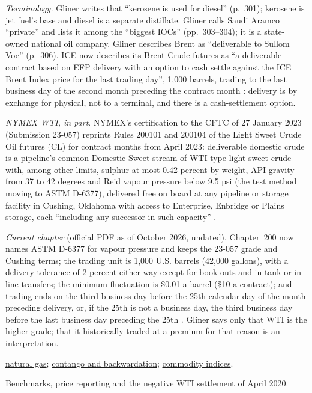 \begin{qfdefinition}
 \emph{Terminology.} Gliner writes that ``kerosene is used for diesel'' (p.~301); kerosene is jet fuel's base and diesel is a separate distillate. Gliner calls Saudi Aramco ``private'' and lists it among the ``biggest IOCs'' (pp.~303--304); it is a state-owned national oil company. Gliner describes Brent as ``deliverable to Sullom Voe'' (p.~306). ICE now describes its Brent Crude futures as ``a deliverable contract based on EFP delivery with an option to cash settle against the ICE Brent Index price for the last trading day'', 1,000 barrels, trading to the last business day of the second month preceding the contract month \citep[contract specifications]{ice-brent-spec}: delivery is by exchange for physical, not to a terminal, and there is a cash-settlement option.

\emph{NYMEX WTI, in part}. NYMEX's certification to the CFTC of 27 January 2023 (Submission 23-057) reprints Rules 200101 and 200104 of the Light Sweet Crude Oil futures (CL) for contract months from April 2023: deliverable domestic crude is a pipeline's common Domestic Sweet stream of WTI-type light sweet crude with, among other limits, sulphur at most 0.42 percent by weight, API gravity from 37 to 42 degrees and Reid vapour pressure below 9.5 psi (the test method moving to ASTM D-6377), delivered free on board at any pipeline or storage facility in Cushing, Oklahoma with access to Enterprise, Enbridge or Plains storage, each ``including any successor in such capacity'' \citep[Exhibits A--B]{nymex-23-057}.

\emph{Current chapter} (official PDF as of October 2026, undated). Chapter~200 now names ASTM D-6377 for vapour pressure and keeps the 23-057 grade and Cushing terms; the trading unit is 1,000 U.S. barrels (42,000 gallons), with a delivery tolerance of 2 percent either way except for book-outs and in-tank or in-line transfers; the minimum fluctuation is \$0.01 a barrel (\$10 a contract); and trading ends on the third business day before the 25th calendar day of the month preceding delivery, or, if the 25th is not a business day, the third business day before the last business day preceding the 25th \citep[Rules 200101 and 200102.B--F]{nymex-ch200-2026}. Gliner says only that WTI is the higher grade; that it historically traded at a premium for that reason is an interpretation.

 \hyperref[def:natural-gas-market]{natural gas}; \hyperref[def:contango-backwardation-stocks]{contango and backwardation}; \hyperref[def:commodity-indices-risk-return]{commodity indices}.

 Benchmarks, price reporting and the negative WTI settlement of April 2020.

\end{qfdefinition}
